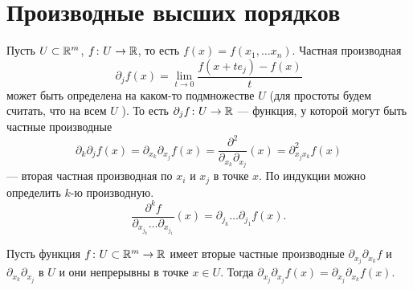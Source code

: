 % 
% 
%
\section{Производные высших порядков}
\begin{defn}
	Пусть $ U \subset \mathbb{R}^{m} $, $ f\colon U \to  \mathbb{R}$, то есть $ f(x) = f(x_1, \ldots x_{n})$. \textsf{Частная производная}
    \[
	\partial _jf(x)  = \lim_{t \to  0} \frac{f(x+t e_j) - f(x)}{t}
    \] 
    может быть определена на каком-то подмножестве $ U$ (для простоты будем считать, что на всем  $ U$ ). То есть $ \partial _j f \colon U \to \mathbb{R}$ --- функция, у которой могут быть частные производные
    \[
		\partial _k \partial _j f(x) =
		\partial _{x_k} \partial _{x_j}f(x) =
		\frac{\partial ^2}{\partial _{x_k} \partial _{x_j}} (x)= \partial ^2_{x_j x_k} f(x)
    \] --- вторая частная производная по $ x_i$ и  $ x_j$ в точке  $ x$. 
	По индукции можно определить  $ k$-ю производную.
	\[
		\frac{\partial ^{k} f}{ \partial _{ x_{j_k} } \ldots \partial _{x_{j_1}}  } (x) =
		\partial _{j_k} \ldots \partial _{j_1} f(x)
	.\] 
\end{defn}
\begin{thm}
Пусть функция $ f\colon U \subset \mathbb{R}^{m} \to  \mathbb{R}$ имеет вторые частные производные  $ \partial _{x_j} \partial _{x_k} f$
и $ \partial _{x_k} \partial _{x_j}$ в $ U$ и они непрерывны в точке   $ x \in U$. 
Тогда $ \partial _{x_j} \partial _{   x_j} f(x) = \partial _{x_j} \partial _{  x_{k}}f(x)$.
\end{thm}
